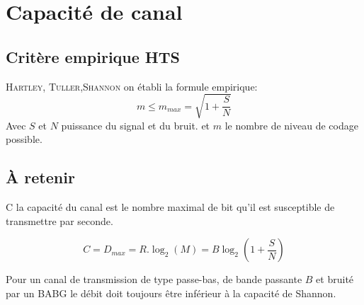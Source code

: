 \documentclass[main.tex]{subfiles}
\begin{document}
  \section{Capacité de canal}

  \subsection{Critère empirique HTS}
  \begin{defin}
    \textsc{Hartley}, \textsc{Tuller},\textsc{Shannon} on établi la
    formule empirique:
    \[
      m \le m_{max} = \sqrt{1+\frac{S}{N}}
    \]
    Avec $S$ et $N$ puissance du signal et du bruit. et $m$ le nombre
    de niveau de codage possible.
  \end{defin}
  \subsection{À retenir}
  \begin{defin}
    C la capacité du canal est le nombre maximal de bit qu'il est
    susceptible de transmettre par seconde.

    \[C = D_{max} = R.\log_2(M) = B\log_2\left(1+\frac{S}{N}\right)
    \]
  \end{defin}

  \begin{prop}
    Pour un canal de transmission de type passe-bas, de bande passante
    $B$ et bruité par un BABG le débit doit toujours être inférieur à
    la capacité de Shannon.
  \end{prop}
\end{document}
